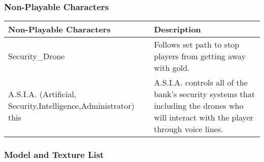 \documentclass[14pt]{report}
\begin{document}
\subsubsection{Non-Playable Characters}

\begin{tabular}{| p{.4\linewidth} | p{.4\linewidth} |}
    \hline    
    Non-Playable Characters &   Description  \\ \hline
    Security\_Drone &    Follows set path to stop players from getting away with gold.  \\ \hline
    A.S.I.A. (Artificial, Security,Intelligence,Administrator) this &   A.S.I.A. controls all of the bank’s security systems that including the drones who will interact with the player through voice lines.  \\
    \hline
\end{tabular}

\subsubsection{Model and Texture List}
\end{document}
